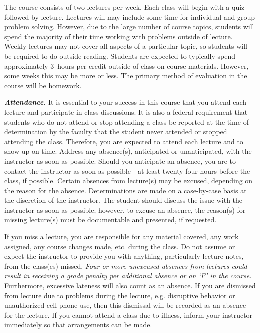 \documentclass[11pt,letterpaper]{article}
\begin{document}
The course consists of two lectures per week. Each class will begin with a quiz followed by lecture. Lectures will may include some time for individual and group problem solving. However, due to the large number of course topics, students will spend the majority of their time working with problems outside of lecture. Weekly lectures may not cover all aspects of a particular topic, so students will be required to do outside reading. Students are expected to typically spend approximately 3~hours per credit outside of class on course materials. However, some weeks this may be more or less. The primary method of evaluation in the course will be homework. \sectionbreak



{\itshape\bfseries\color{stacred}Attendance.} It is essential to your success in this course that you attend each lecture and participate in class discussions. It is also a federal requirement that students who do not attend or stop attending a class be reported at the time of determination by the faculty that the student never attended or stopped attending the class. Therefore, you are expected to attend each lecture and to show up on time. Address any absence(s), anticipated or unanticipated, with the instructor as soon as possible. Should you anticipate an absence, you are to contact the instructor as soon as possible---at least twenty-four hours before the class, if possible.  Certain absences from lecture(s) may be excused, depending on the reason for the absence. Determinations are made on a case-by-case basis at the discretion of the instructor. The student should discuss the issue with the instructor as soon as possible; however, to excuse an absence, the reason(s) for missing lecture(s) must be documentable and presented, if requested. \pspace

If you miss a lecture, you are responsible for any material covered, any work assigned, any course changes made, etc. during the class. Do not assume or expect the instructor to provide you with anything, particularly lecture notes, from the class(es) missed. {\itshape Four or more unexcused absences from lectures could result in receiving a grade penalty per additional absence or an `F' in the course.} Furthermore, excessive lateness will also count as an absence. If you are dismissed from lecture due to problems during the lecture, e.g. disruptive behavior or unauthorized cell phone use, then this dismissal will be recorded as an absence for the lecture. If you cannot attend a class due to illness, inform your instructor immediately so that arrangements can be made. \pspace
\end{document}
